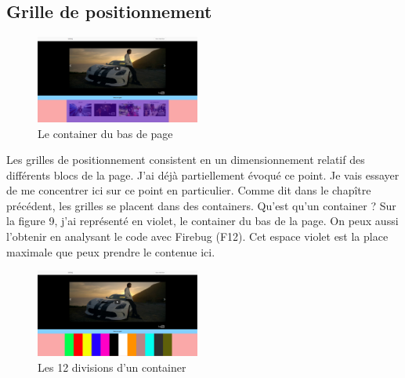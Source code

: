 \documentclass{article}
\begin{document}
\subsection{Grille de positionnement}

\begin{figure}
  \vspace{-25pt}
  \begin{center}
    \includegraphics[width=0.48\textwidth]{p10}
  \end{center}
  \vspace{-20pt}
  \caption{Le container du bas de page}
  \vspace{-10pt}
\end{figure} 

Les grilles de positionnement consistent en un dimensionnement relatif des diff\'erents blocs de la page. J'ai d\'ej\`a partiellement \'evoqu\'e ce point. Je vais essayer de me concentrer ici sur ce point en particulier. Comme dit dans le chap\^itre pr\'ec\'edent, les grilles se placent dans des containers. Qu'est qu'un container ? Sur la figure 9, j'ai repr\'esent\'e en violet, le container du bas de la page. On peux aussi l'obtenir en analysant le code avec Firebug (F12). Cet espace violet est la place maximale que peux prendre le contenue ici.\\

\begin{figure}
  \vspace{-25pt}
  \begin{center}
    \includegraphics[width=0.48\textwidth]{p12}
  \end{center}
  \vspace{-20pt}
  \caption{Les 12 divisions d'un container}
  \vspace{-10pt}
\end{figure} 
\end{document}
